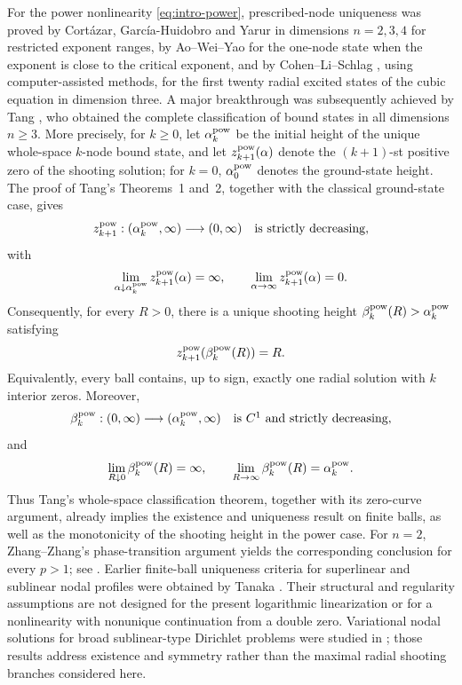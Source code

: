 \documentclass[11pt]{article}
\begin{document}
For the power nonlinearity \eqref{eq:intro-power}, prescribed-node
uniqueness was proved by Cort\'{a}zar, Garc\'{i}a-Huidobro and Yarur
\cite{CGY11} in dimensions $n=2,3,4$ for restricted exponent ranges, by
Ao--Wei--Yao \cite{AWY16} for the one-node state when the exponent is close to
the critical exponent, and by Cohen--Li--Schlag \cite{CLS24}, using
computer-assisted methods, for the first twenty radial excited states of the
cubic equation in dimension three.
A major breakthrough was subsequently achieved by Tang \cite{Tang},
who obtained the complete classification of bound states in all dimensions $n\geq3$.
{More precisely, for $k\ge0$, let $\alpha_k^{\rm pow}$ be the initial
height of the unique whole-space $k$-node bound state, and let
$z_{k+1}^{\rm pow}(\alpha)$ denote the $(k+1)$-st positive zero of
the shooting solution; for $k=0$, $\alpha_0^{\rm pow}$ denotes the
ground-state height. The proof of Tang's Theorems~1 and~2, together
with the classical ground-state case, gives}
\begin{equation*}
 z_{k+1}^{\rm pow}:(\alpha_k^{\rm pow},\infty)
 \longrightarrow(0,\infty)
 \quad\hbox{is strictly decreasing},
\end{equation*}
with
\begin{equation*}
 \lim_{\alpha\downarrow\alpha_k^{\rm pow}}
 z_{k+1}^{\rm pow}(\alpha)=\infty,
 \qquad
 \lim_{\alpha\to\infty}z_{k+1}^{\rm pow}(\alpha)=0.
\end{equation*}
Consequently, for every $R>0$, there is a unique shooting height
$\beta_k^{\rm pow}(R)>\alpha_k^{\rm pow}$ satisfying
\[
 z_{k+1}^{\rm pow}(\beta_k^{\rm pow}(R))=R.
\]
{Equivalently, every ball contains, up to sign, exactly one
radial solution with $k$ interior zeros.}
Moreover,
\begin{equation}\label{eq:intro-power-beta}
 \beta_k^{\rm pow}:(0,\infty)
 \longrightarrow(\alpha_k^{\rm pow},\infty)
 \quad\hbox{is $C^1$ and strictly decreasing},
\end{equation}
and
\begin{equation}\label{eq:intro-power-beta-endpoints}
\lim\limits_{R\downarrow0} \beta_k^{\rm pow}(R)=\infty,
 \qquad
\lim\limits_{R\to\infty} \beta_k^{\rm pow}(R)=\alpha_k^{\rm pow}.
\end{equation}
Thus Tang's whole-space classification theorem, together with its zero-curve
argument, already implies the existence and uniqueness result on finite balls, as well as the monotonicity of the shooting height in the power case.
For $n=2$, Zhang--Zhang's phase-transition argument yields the corresponding
conclusion for every $p>1$; see \cite[Section~6]{ZhangZhang}. Earlier
finite-ball uniqueness criteria for superlinear and sublinear nodal profiles
were obtained by Tanaka \cite{TanakaSuper,TanakaSub,Tanaka}. Their structural and
regularity assumptions are not designed for the present logarithmic
linearization or for a nonlinearity with nonunique continuation from a double
zero. Variational nodal solutions for broad sublinear-type Dirichlet
problems were studied in \cite{BonheureSantosPariniTavaresWeth}; those results
address existence and symmetry rather than the maximal radial shooting
branches considered here.
\end{document}
